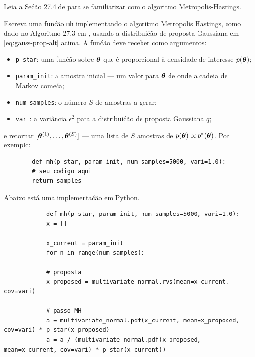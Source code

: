 \begin{exenumerate}
    \item Leia a Se\'c\~ao 27.4 de \citet{Barber2012} para se familiarizar com o algoritmo Metropolis-Hastings.
    
    \item\label{qpt:mh-alt} Escreva uma fun\'c\~ao \lstinline|mh| implementando o
    algoritmo Metropolis Hastings, como dado no Algoritmo 27.3 em
    \citet{Barber2012}, usando a distribui\'c\~ao de proposta Gaussiana em \eqref{eq:gauss-prop-alt} acima. A
    fun\'c\~ao deve receber como argumentos:
    \begin{itemize}
        \item \lstinline{p_star}: uma fun\'c\~ao sobre $\boldsymbol{\theta}$ que \'e proporcional \`a densidade de interesse $p(\boldsymbol{\theta})$;
        \item \lstinline{param_init}: a amostra inicial --- um valor para $\boldsymbol{\theta}$ de onde a cadeia de Markov come\'ca;
        \item \lstinline{num_samples}: o n\'umero $S$ de amostras a gerar;
        \item \lstinline{vari}: a vari\^ancia $\epsilon^2$ para a distribui\'c\~ao de proposta Gaussiana $q$;
    \end{itemize}
    e retornar $[\boldsymbol{\theta}^{(1)}, \dots, \boldsymbol{\theta}^{(S)}]$ --- uma lista de $S$ amostras de $p(\boldsymbol{\theta}) \propto p^*(\boldsymbol{\theta})$. Por exemplo:
    \begin{lstlisting}
        def mh(p_star, param_init, num_samples=5000, vari=1.0):
        # seu codigo aqui
        return samples
    \end{lstlisting}
    
    
    
    \begin{solution}
        
        
        Abaixo est\'a uma implementa\'c\~ao em Python.
        \begin{lstlisting}
            def mh(p_star, param_init, num_samples=5000, vari=1.0):
            x = []
            
            x_current = param_init
            for n in range(num_samples):
            
            # proposta
            x_proposed = multivariate_normal.rvs(mean=x_current, cov=vari)
            
            # passo MH
            a = multivariate_normal.pdf(x_current, mean=x_proposed, cov=vari) * p_star(x_proposed)
            a = a / (multivariate_normal.pdf(x_proposed, mean=x_current, cov=vari) * p_star(x_current))
            

\end{lstlisting}
\end{solution}
\end{exenumerate}

